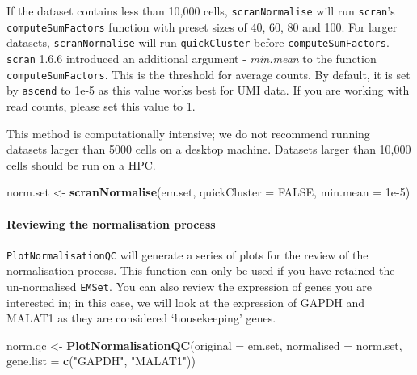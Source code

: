 \documentclass[]{article}
\newenvironment{Shaded}{\begin{snugshade}}{\end{snugshade}}
\newcommand{\DataTypeTok}[1]{\textcolor[rgb]{0.13,0.29,0.53}{#1}}
\newcommand{\FloatTok}[1]{\textcolor[rgb]{0.00,0.00,0.81}{#1}}
\newcommand{\KeywordTok}[1]{\textcolor[rgb]{0.13,0.29,0.53}{\textbf{#1}}}
\newcommand{\NormalTok}[1]{#1}
\newcommand{\OtherTok}[1]{\textcolor[rgb]{0.56,0.35,0.01}{#1}}
\newcommand{\StringTok}[1]{\textcolor[rgb]{0.31,0.60,0.02}{#1}}
\let\oldparagraph\paragraph
\renewcommand{\paragraph}[1]{\oldparagraph{#1}\mbox{}}
\begin{document}
If the dataset contains less than 10,000 cells, \texttt{scranNormalise}
will run \texttt{scran}'s \texttt{computeSumFactors} function with
preset sizes of 40, 60, 80 and 100. For larger datasets,
\texttt{scranNormalise} will run \texttt{quickCluster} before
\texttt{computeSumFactors}. \texttt{scran} 1.6.6 introduced an
additional argument - \emph{min.mean} to the function
\texttt{computeSumFactors}. This is the threshold for average counts. By
default, it is set by \texttt{ascend} to 1e-5 as this value works best
for UMI data. If you are working with read counts, please set this value
to 1.

This method is computationally intensive; we do not recommend running
datasets larger than 5000 cells on a desktop machine. Datasets larger
than 10,000 cells should be run on a HPC.

\begin{Shaded}
\begin{Highlighting}[]
\NormalTok{norm.set <-}\StringTok{ }\KeywordTok{scranNormalise}\NormalTok{(em.set, }\DataTypeTok{quickCluster =} \OtherTok{FALSE}\NormalTok{, }\DataTypeTok{min.mean =} \FloatTok{1e-5}\NormalTok{)}
\end{Highlighting}
\end{Shaded}

\hypertarget{reviewing-the-normalisation-process}{%
\paragraph{Reviewing the normalisation
process}\label{reviewing-the-normalisation-process}}

\texttt{PlotNormalisationQC} will generate a series of plots for the
review of the normalisation process. This function can only be used if
you have retained the un-normalised \texttt{EMSet}. You can also review
the expression of genes you are interested in; in this case, we will
look at the expression of GAPDH and MALAT1 as they are considered
`housekeeping' genes.

\begin{Shaded}
\begin{Highlighting}[]
\NormalTok{norm.qc <-}\StringTok{ }\KeywordTok{PlotNormalisationQC}\NormalTok{(}\DataTypeTok{original =}\NormalTok{ em.set, }\DataTypeTok{normalised =}\NormalTok{ norm.set, }
                               \DataTypeTok{gene.list =} \KeywordTok{c}\NormalTok{(}\StringTok{"GAPDH"}\NormalTok{, }\StringTok{"MALAT1"}\NormalTok{))}
\end{Highlighting}
\end{Shaded}
\end{document}
